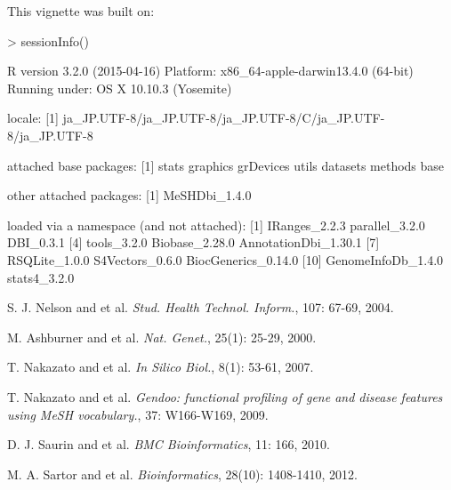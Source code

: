 \documentclass[11pt]{article}
\begin{document}
This vignette was built on:
\begin{Schunk}
\begin{Sinput}
> sessionInfo()
\end{Sinput}
\begin{Soutput}
R version 3.2.0 (2015-04-16)
Platform: x86_64-apple-darwin13.4.0 (64-bit)
Running under: OS X 10.10.3 (Yosemite)

locale:
[1] ja_JP.UTF-8/ja_JP.UTF-8/ja_JP.UTF-8/C/ja_JP.UTF-8/ja_JP.UTF-8

attached base packages:
[1] stats     graphics  grDevices utils     datasets  methods   base     

other attached packages:
[1] MeSHDbi_1.4.0

loaded via a namespace (and not attached):
 [1] IRanges_2.2.3        parallel_3.2.0       DBI_0.3.1           
 [4] tools_3.2.0          Biobase_2.28.0       AnnotationDbi_1.30.1
 [7] RSQLite_1.0.0        S4Vectors_0.6.0      BiocGenerics_0.14.0 
[10] GenomeInfoDb_1.4.0   stats4_3.2.0        
\end{Soutput}
\end{Schunk}

\newpage

\vspace{2cm}

\begin{thebibliography}{9}

S. J. Nelson and et al.
\newblock \emph{Stud. Health Technol. Inform.}, 107: 67-69, 2004.

M. Ashburner and et al.
\newblock \emph{Nat. Genet.}, 25(1): 25-29, 2000.

T. Nakazato and et al.
\newblock \emph {In Silico Biol.}, 8(1): 53-61, 2007.

T. Nakazato and et al.
\newblock \emph {Gendoo: functional profiling of gene and disease features using MeSH vocabulary.}, 37: W166-W169, 2009.

D. J. Saurin and et al.
\newblock \emph {BMC Bioinformatics}, 11: 166, 2010.

M. A. Sartor and et al.
\newblock \emph {Bioinformatics}, 28(10): 1408-1410, 2012.

\end{thebibliography}
\end{document}
